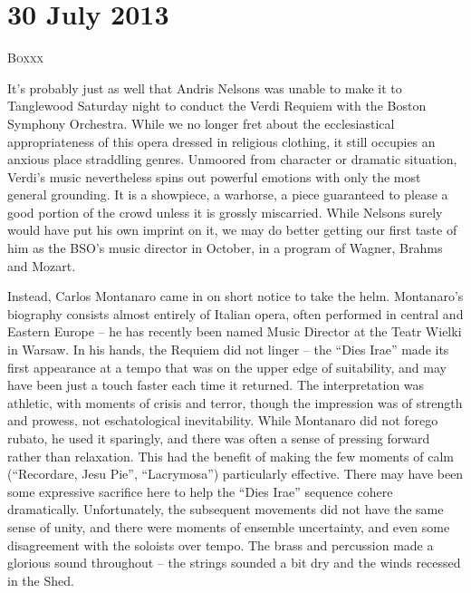 \chapter{30 July 2013}

\textsc{Boxxx}

It’s probably just as well that Andris Nelsons was unable to make it to Tanglewood Saturday night to conduct the Verdi Requiem with the Boston Symphony Orchestra. While we no longer fret about the ecclesiastical appropriateness of this opera dressed in religious clothing, it still occupies an anxious place straddling genres. Unmoored from character or dramatic situation, Verdi’s music nevertheless spins out powerful emotions with only the most general grounding. It is a showpiece, a warhorse, a piece guaranteed to please a good portion of the crowd unless it is grossly miscarried. While Nelsons surely would have put his own imprint on it, we may do better getting our first taste of him as the BSO’s music director in October, in a program of Wagner, Brahms and Mozart.

Instead, Carlos Montanaro came in on short notice to take the helm. Montanaro’s biography consists almost entirely of Italian opera, often performed in central and Eastern Europe – he has recently been named Music Director at the Teatr Wielki in Warsaw. In his hands, the Requiem did not linger – the “Dies Irae” made its first appearance at a tempo that was on the upper edge of suitability, and may have been just a touch faster each time it returned. The interpretation was athletic, with moments of crisis and terror, though the impression was of strength and prowess, not eschatological inevitability. While Montanaro did not forego rubato, he used it sparingly, and there was often a sense of pressing forward rather than relaxation. This had the benefit of making the few moments of calm (“Recordare, Jesu Pie”, “Lacrymosa”) particularly effective. There may have been some expressive sacrifice here to help the “Dies Irae” sequence cohere dramatically. Unfortunately, the subsequent movements did not have the same sense of unity, and there were moments of ensemble uncertainty, and even some disagreement with the soloists over tempo. The brass and percussion made a glorious sound throughout – the strings sounded a bit dry and the winds recessed in the Shed.

